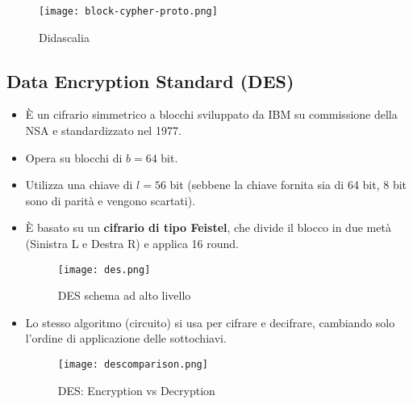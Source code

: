 \documentclass[../main.tex]{subfiles}
\begin{document}
\begin{figure}[H]
  \centering
  \texttt{[image: block-cypher-proto.png]}
  \caption{Didascalia}
  \label{fig:etichetta}
\end{figure}

\subsection{Data Encryption Standard (DES)}
\begin{itemize}
    \item È un cifrario simmetrico a blocchi sviluppato da IBM su commissione della NSA e standardizzato nel 1977.
    \item Opera su blocchi di $b=64$ bit.
    \item Utilizza una chiave di $l=56$ bit (sebbene la chiave fornita sia di 64 bit, 8 bit sono di parità e vengono scartati).
    \item È basato su un \textbf{cifrario di tipo Feistel}, che divide il blocco in due metà (Sinistra L e Destra R) e applica 16 round.
    
    \begin{figure}[H]
      \centering
      \texttt{[image: des.png]}
      \caption{DES schema ad alto livello}
      \label{fig:etichetta}
    \end{figure}
    
    
    \item Lo stesso algoritmo (circuito) si usa per cifrare e decifrare, cambiando solo l'ordine di applicazione delle sottochiavi.
    
   \begin{figure}[H]
     \centering
     \texttt{[image: descomparison.png]}
     \caption{DES: Encryption vs Decryption}
     \label{fig:etichetta}
   \end{figure}
    

\end{itemize}
\end{document}
